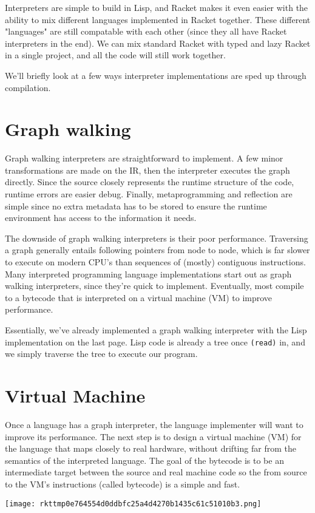 \documentclass{book}
\newcommand{\Scribtexttt}[1]{{\texttt{#1}}}
\let\SOriginalthesubsubsection\thesubsubsection
\newcommand{\Ssubsection}[2]{\subsection[#1]{#2}\let\thesubsubsection\SOriginalthesubsubsection}
\renewcommand{\Ssubsection}[2]{\section[#1]{#2}}
\begin{document}
Interpreters are simple to build in Lisp, and Racket makes it even easier
with the ability to mix different languages implemented in Racket
together. These different "languages" are still compatable with each other
(since they all have Racket interpreters in the end). We can mix standard
Racket with typed and lazy Racket in a single project, and all the code
will still work together.

We{'}ll briefly look at a few ways interpreter implementations are sped up
through compilation.

\Ssubsection{Graph walking}{Graph walking}\label{t:x28part_x22Graphx5fwalkingx22x29}

Graph walking interpreters are straightforward to implement. A few minor
transformations are made on the IR, then the interpreter executes the
graph directly. Since the source closely represents the runtime structure
of the code, runtime errors are easier debug. Finally, metaprogramming and
reflection are simple since no extra metadata has to be stored to ensure
the runtime environment has access to the information it needs.

The downside of graph walking interpreters is their poor performance.
Traversing a graph generally entails following pointers from node to node,
which is far slower to execute on modern CPU{'}s than sequences of (mostly)
contiguous instructions. Many interpreted programming language
implementations start out as graph walking interpreters, since they{'}re
quick to implement. Eventually, most compile to a bytecode that is
interpreted on a virtual machine (VM) to improve performance.

Essentially, we{'}ve already implemented a graph walking interpreter with the
Lisp implementation on the last page. Lisp code is already a tree once
\Scribtexttt{(read)} in, and we simply traverse the tree to execute our program.

\Ssubsection{Virtual Machine}{Virtual Machine}\label{t:x28part_x22Virtualx5fMachinex22x29}

Once a language has a graph interpreter, the language implementer will
want to improve its performance. The next step is to design a virtual
machine (VM) for the language that maps closely to real hardware, without
drifting far from the semantics of the interpreted language. The goal of
the bytecode is to be an intermediate target between the source and real
machine code so the from source to the VM{'}s instructions (called bytecode)
is a simple and fast.

\texttt{[image: rkttmp0e764554d0ddbfc25a4d4270b1435c61c51010b3.png]}
\end{document}

